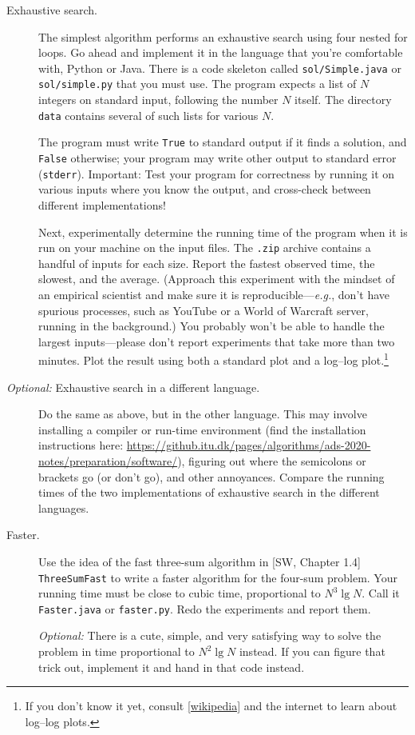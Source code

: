 \documentclass[nobib]{tufte-handout}
\begin{document}
\begin{description}
  \item[Exhaustive search.]
The simplest algorithm performs an exhaustive search using four nested for loops.
Go ahead and implement it in the language that you're comfortable with, Python or Java.
There is a code skeleton called \texttt{sol/Simple.java} or \texttt{sol/simple.py} that you must use.
The program expects a list of $N$ integers on standard input, following the number $N$ itself.
The directory \texttt{data} contains several of such lists for various $N$.

The program must write \texttt{True} to standard output if it finds a solution, and \texttt{False} otherwise;
your program may write other output to standard error (\texttt{stderr}).
Important: Test your program for correctness by running it on various inputs where you know the output, and cross-check between different implementations!

Next, experimentally determine the running time of the program when it is run on your machine on the input files.
The \texttt{.zip} archive contains a handful of inputs for each size.
Report the fastest observed time, the slowest, and the average.
(Approach this experiment with the mindset of an empirical scientist and make sure it is reproducible---\emph{e.g.}, don't have spurious processes, such as YouTube or a World of Warcraft server, running in the background.)
You probably won't be able to handle the largest inputs---please don't report experiments that take more than two minutes.
Plot the result using both a standard plot and a log--log plot.\footnote{If you don't know it yet, consult \href{https://en.wikipedia.org/wiki/Log\%E2\%80\%93log\_plot}{[wikipedia]} and the internet to learn about log--log plots.}

\item[\emph{Optional:} Exhaustive search in a different language.]
  Do the same as above, but in the other language.
  This may involve installing a compiler or run-time environment (find the installation instructions here: \url{https://github.itu.dk/pages/algorithms/ads-2020-notes/preparation/software/}), figuring out where the semicolons or brackets go (or don't go), and other annoyances.
  Compare the running times of the two implementations of exhaustive search in the different languages.

\item[Faster.]
  Use the idea of the fast three-sum algorithm in [SW, Chapter 1.4] \texttt{
  ThreeSumFast} to write a faster algorithm for the four-sum problem.
  Your running time must be close to cubic time, proportional to $N^3\lg N$.
  Call it \texttt{Faster.java}  or \texttt{faster.py}.
  Redo the experiments and report them.

  \emph{Optional:} There is a cute, simple, and very satisfying way to solve the problem in time proportional to $N^2\lg N$ instead.
If you can figure that trick out, implement it and hand in that code instead.
\end{description}
\end{document}
